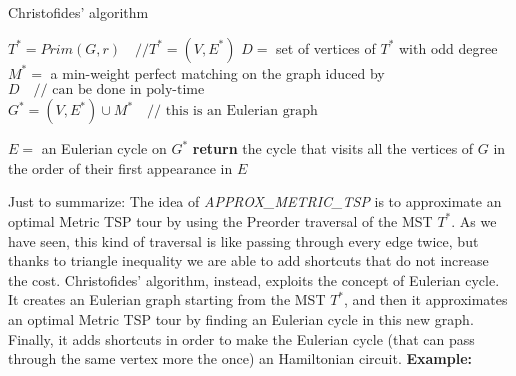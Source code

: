 \begin{algorithm}
\caption{Christofides' algorithm}\label{Christofides}
    \begin{algorithmic}[1]
        \State $T^* = Prim(G, r) \quad //T^*=(V, E^*)$
        \State $D =$ set of vertices of $T^*$ with odd degree
        \State $M^* = $ a min-weight perfect matching on the graph iduced by $D \quad \text{// can be done in poly-time}$ 
        \State $G^* = (V, E^*) \cup M^* \quad \text{// this is an Eulerian graph}$

        \State $E= $ an Eulerian cycle on $G^*$
        \State \textbf{return} the cycle that visits all the vertices of $G$ in the order of their first appearance in $E$ 
    \EndProcedure   
    \end{algorithmic}
\end{algorithm}\newline\newline
Just to summarize: The idea of \textit{APPROX\_METRIC\_TSP} is to approximate an optimal Metric TSP tour by using the Preorder traversal of the MST $T^*$. As we have seen, this kind of traversal is like passing through every edge twice, but thanks to triangle inequality we are able to add shortcuts that do not increase the cost. Christofides' algorithm, instead, exploits the concept of Eulerian cycle. It creates an Eulerian graph starting from the MST $T^*$, and then it approximates an optimal Metric TSP tour by finding an Eulerian cycle in this new graph. Finally, it adds shortcuts in order to make the Eulerian cycle (that can pass through the same vertex more the once) an Hamiltonian circuit.\newline\newline
\textbf{Example:}\newline\newline
{}\newline\newline
